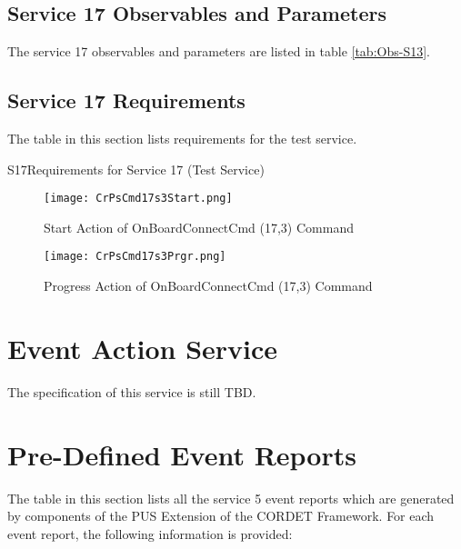 \documentclass{pnp_article}
\begin{document}

\subsection{Service 17 Observables and Parameters}\label{sec:serv17Obs}
The service 17 observables and parameters are listed in table \ref{tab:Obs-S13}.



\subsection{Service 17 Requirements}
The table in this section lists requirements for the test service.

\begin{crReq}{S17}{Requirements for Service 17 (Test Service)}
\end{crReq}

\newpage
\begin{figure}[H]
 \centering
 \texttt{[image: CrPsCmd17s3Start.png]}
 \caption{Start Action of OnBoardConnectCmd (17,3) Command}
 \label{fig:Cmd17s3Start}
\end{figure}

\begin{figure}[H]
 \centering
 \texttt{[image: CrPsCmd17s3Prgr.png]}
 \caption{Progress Action of OnBoardConnectCmd (17,3) Command}
 \label{fig:Cmd17s3Prgr}
\end{figure}


\section{Event Action Service}\label{sec:serv19}
The specification of this service is still TBD.



\newpage
\appendix
\section{Pre-Defined Event Reports}\label{sec:preDefEvtRep}
The table in this section lists all the service 5 event reports which are generated by components of the PUS Extension of the CORDET Framework. For each event report, the following information is provided:
\end{document}
